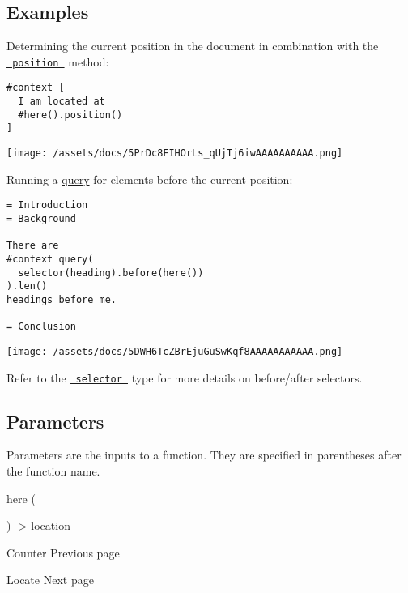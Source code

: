 \subsection{Examples}\label{examples}

Determining the current position in the document in combination with the
\href{/docs/reference/introspection/location/\#definitions-position}{\texttt{\ position\ }}
method:

\begin{verbatim}
#context [
  I am located at
  #here().position()
]
\end{verbatim}

\texttt{[image: /assets/docs/5PrDc8FIHOrLs\_qUjTj6iwAAAAAAAAAA.png]}

Running a \href{/docs/reference/introspection/query/}{query} for
elements before the current position:

\begin{verbatim}
= Introduction
= Background

There are
#context query(
  selector(heading).before(here())
).len()
headings before me.

= Conclusion
\end{verbatim}

\texttt{[image: /assets/docs/5DWH6TcZBrEjuGuSwKqf8AAAAAAAAAAA.png]}

Refer to the
\href{/docs/reference/foundations/selector/}{\texttt{\ selector\ }} type
for more details on before/after selectors.

\subsection{\texorpdfstring{{ Parameters
}}{ Parameters }}\label{parameters}

\label{parameters-tooltip}
Parameters are the inputs to a function. They are specified in
parentheses after the function name.

{ here } (

) -\textgreater{}
\href{/docs/reference/introspection/location/}{location}

\href{/docs/reference/introspection/counter/}{\pandocbounded{}}

{ Counter } { Previous page }

\href{/docs/reference/introspection/locate/}{\pandocbounded{}}

{ Locate } { Next page }
